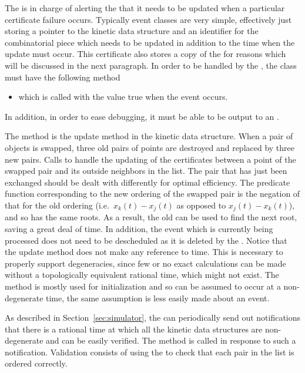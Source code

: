 The  is in charge of alerting the
 that it needs to be updated when a
particular certificate failure occurs. Typically event classes are
very simple, effectively just storing a pointer to the kinetic data
structure and an identifier for the combinatorial piece which needs to
be updated in addition to the time when the update must occur. This
certificate also stores a copy of the  for reasons
which will be discussed in the next paragraph. In order to be handled
by the , the  class must have the following
method
\begin{itemize}
\item {} which is called with the value true when the event occurs.
\end{itemize}
\noindent In addition, in order to ease debugging,
it must be able to be output to an .

The  method is the update method in the  kinetic
data structure. When a pair of objects is swapped, three old pairs of
points are destroyed and replaced by three new pairs. Calls to
 handle the updating of the certificates
between a point of the swapped pair and its outside neighbors in the
list. The pair that has just been exchanged should be dealt with
differently for optimal efficiency. The predicate function
corresponding to the new ordering of the swapped pair is the negation
of that for the old ordering (i.e.\ $x_k(t)-x_j(t)$ as opposed to
$x_j(t)-x_k(t)$), and so has the same roots. As a result, the old
 can be used to find the next root, saving a great
deal of time. In addition, the event which is currently being
processed does not need to be descheduled as it is deleted by the
. Notice that the update method does not make any
reference to time. This is necessary to properly support degeneracies,
since few or no exact calculations can be made without a topologically
equivalent rational time, which might not exist. The 
method is mostly used for initialization and so can be assumed to
occur at a non-degenerate time, the same assumption is less easily
made about an event.

As described in Section~\ref{sec:simulator}, the  can
periodically send out notifications that there is a rational time at
which all the kinetic data structures are non-degenerate and can be
easily verified. The  method is called in response to such
a notification. Validation consists of using the
 to check that each pair in the list is
ordered correctly.

